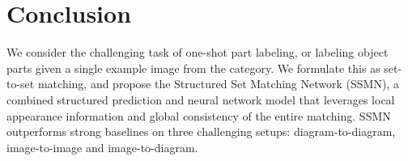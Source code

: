 \documentclass[10pt,twocolumn,letterpaper]{article}
\begin{document}
\section{Conclusion}
\label{sec:conclusion}
We consider the challenging task of one-shot part labeling, or labeling object parts given a single example image from the category. We formulate this as set-to-set matching, and propose the Structured Set Matching Network (SSMN), a combined structured prediction and neural network model that leverages local appearance information and global consistency of the entire matching. SSMN outperforms strong baselines on three challenging setups: diagram-to-diagram, image-to-image and image-to-diagram.



{\small


}
\end{document}
